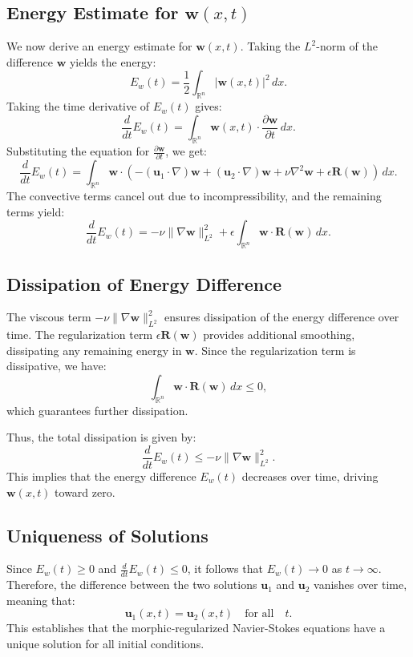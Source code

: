 \documentclass{article}
\begin{document}
\subsection*{Energy Estimate for \( \mathbf{w}(x,t) \)}

We now derive an energy estimate for \( \mathbf{w}(x,t) \). Taking the \( L^2 \)-norm of the difference \( \mathbf{w} \) yields the energy:
\[
E_w(t) = \frac{1}{2} \int_{\mathbb{R}^n} |\mathbf{w}(x,t)|^2 \, dx.
\]
Taking the time derivative of \( E_w(t) \) gives:
\[
\frac{d}{dt} E_w(t) = \int_{\mathbb{R}^n} \mathbf{w}(x,t) \cdot \frac{\partial \mathbf{w}}{\partial t} \, dx.
\]
Substituting the equation for \( \frac{\partial \mathbf{w}}{\partial t} \), we get:
\[
\frac{d}{dt} E_w(t) = \int_{\mathbb{R}^n} \mathbf{w} \cdot \left( - (\mathbf{u}_1 \cdot \nabla) \mathbf{w} + (\mathbf{u}_2 \cdot \nabla) \mathbf{w} + \nu \nabla^2 \mathbf{w} + \epsilon \mathbf{R}(\mathbf{w}) \right) \, dx.
\]
The convective terms cancel out due to incompressibility, and the remaining terms yield:
\[
\frac{d}{dt} E_w(t) = - \nu \|\nabla \mathbf{w}\|_{L^2}^2 + \epsilon \int_{\mathbb{R}^n} \mathbf{w} \cdot \mathbf{R}(\mathbf{w}) \, dx.
\]

\subsection*{Dissipation of Energy Difference}

The viscous term \( - \nu \|\nabla \mathbf{w}\|_{L^2}^2 \) ensures dissipation of the energy difference over time. The regularization term \( \epsilon \mathbf{R}(\mathbf{w}) \) provides additional smoothing, dissipating any remaining energy in \( \mathbf{w} \). Since the regularization term is dissipative, we have:
\[
\int_{\mathbb{R}^n} \mathbf{w} \cdot \mathbf{R}(\mathbf{w}) \, dx \leq 0,
\]
which guarantees further dissipation.

Thus, the total dissipation is given by:
\[
\frac{d}{dt} E_w(t) \leq - \nu \|\nabla \mathbf{w}\|_{L^2}^2.
\]
This implies that the energy difference \( E_w(t) \) decreases over time, driving \( \mathbf{w}(x,t) \) toward zero.

\subsection*{Uniqueness of Solutions}

Since \( E_w(t) \geq 0 \) and \( \frac{d}{dt} E_w(t) \leq 0 \), it follows that \( E_w(t) \to 0 \) as \( t \to \infty \). Therefore, the difference between the two solutions \( \mathbf{u}_1 \) and \( \mathbf{u}_2 \) vanishes over time, meaning that:
\[
\mathbf{u}_1(x,t) = \mathbf{u}_2(x,t) \quad \text{for all} \quad t.
\]
This establishes that the morphic-regularized Navier-Stokes equations have a unique solution for all initial conditions.
\end{document}
